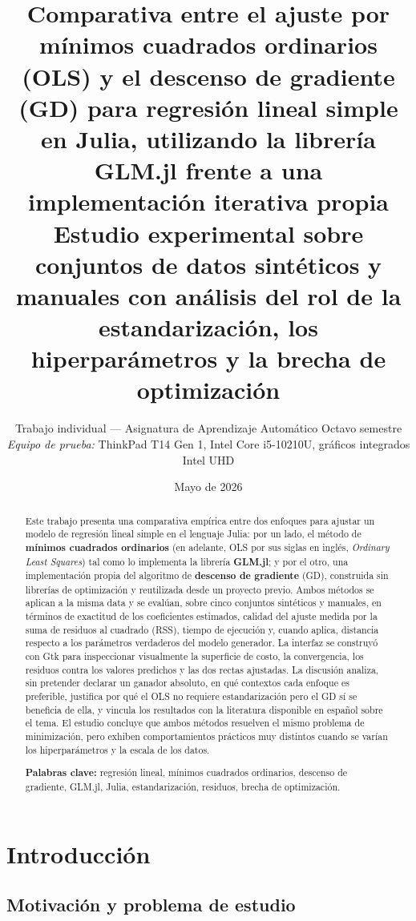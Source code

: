 \documentclass[11pt,a4paper]{article}
\title{\vspace{-1.5cm}\textbf{Comparativa entre el ajuste por mínimos cuadrados ordinarios (OLS) y el descenso de gradiente (GD) para regresión lineal simple en Julia, utilizando la librería GLM.jl frente a una implementación iterativa propia}\\[0.5em]
\large Estudio experimental sobre conjuntos de datos sintéticos y manuales con análisis del rol de la estandarización, los hiperparámetros y la brecha de optimización}
\author{Trabajo individual --- Asignatura de Aprendizaje Automático Octavo semestre\\[0.3em]
\textit{Equipo de prueba:} ThinkPad T14 Gen 1, Intel Core i5-10210U, gráficos integrados Intel UHD}
\date{Mayo de 2026}
\begin{document}
\maketitle
\thispagestyle{empty}

\begin{abstract}
\noindent
Este trabajo presenta una comparativa empírica entre dos enfoques para ajustar un modelo de regresión lineal simple en el lenguaje Julia: por un lado, el método de \textbf{mínimos cuadrados ordinarios} (en adelante, OLS por sus siglas en inglés, \textit{Ordinary Least Squares}) tal como lo implementa la librería \textbf{GLM.jl}; y por el otro, una implementación propia del algoritmo de \textbf{descenso de gradiente} (GD), construida sin librerías de optimización y reutilizada desde un proyecto previo. Ambos métodos se aplican a la misma data y se evalúan, sobre cinco conjuntos sintéticos y manuales, en términos de exactitud de los coeficientes estimados, calidad del ajuste medida por la suma de residuos al cuadrado (RSS), tiempo de ejecución y, cuando aplica, distancia respecto a los parámetros verdaderos del modelo generador. La interfaz se construyó con Gtk para inspeccionar visualmente la superficie de costo, la convergencia, los residuos contra los valores predichos y las dos rectas ajustadas. La discusión analiza, sin pretender declarar un ganador absoluto, en qué contextos cada enfoque es preferible, justifica por qué el OLS no requiere estandarización pero el GD sí se beneficia de ella, y vincula los resultados con la literatura disponible en español sobre el tema. El estudio concluye que ambos métodos resuelven el mismo problema de minimización, pero exhiben comportamientos prácticos muy distintos cuando se varían los hiperparámetros y la escala de los datos.

\vspace{0.5em}
\noindent\textbf{Palabras clave:} regresión lineal, mínimos cuadrados ordinarios, descenso de gradiente, GLM.jl, Julia, estandarización, residuos, brecha de optimización.
\end{abstract}

\section{Introducción}

\subsection{Motivación y problema de estudio}
\end{document}
